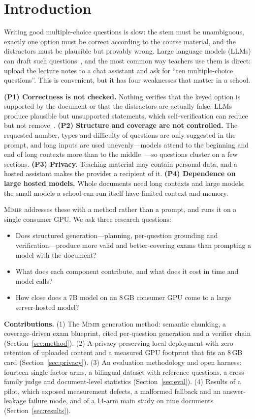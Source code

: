\documentclass[conference]{IEEEtran}
\newcommand{\Mimir}{\textsc{Mimir}}
\begin{document}
\section{Introduction}

Writing good multiple-choice questions is slow: the stem must be unambiguous, exactly one option must
be correct according to the course material, and the distractors must be plausible but provably
wrong. Large language models (LLMs) can draft such questions~\cite{kurdi2020systematic,alhazmi2024distractor},
and the most common way teachers use them is direct: upload the lecture notes to a chat assistant and
ask for ``ten multiple-choice questions''. This is convenient, but it has four weaknesses that matter
in a school.

\textbf{(P1) Correctness is not checked.} Nothing verifies that the keyed option is supported by the
document or that the distractors are actually false; LLMs produce plausible but unsupported
statements, which self-verification can reduce but not remove~\cite{madaan2023selfrefine,dhuliawala2024cove}.
\textbf{(P2) Structure and coverage are not controlled.} The requested number, types and difficulty
of questions are only suggested in the prompt, and long inputs are used unevenly---models attend to
the beginning and end of long contexts more than to the middle~\cite{liu2024lost}---so questions
cluster on a few sections. \textbf{(P3) Privacy.} Teaching material may contain personal data, and a
hosted assistant makes the provider a recipient of it. \textbf{(P4) Dependence on large hosted models.}
Whole documents need long contexts and large models; the small models a school can run itself have
limited context and memory.

\Mimir{} addresses these with a method rather than a prompt, and runs it on a single consumer GPU.
We ask three research questions:
\begin{itemize}
\item[\textbf{RQ1}] Does structured generation---planning, per-question grounding and
verification---produce more valid and better-covering exams than prompting a model with the document?
\item[\textbf{RQ2}] What does each component contribute, and what does it cost in time and model calls?
\item[\textbf{RQ3}] How close does a 7B model on an 8\,GB consumer GPU come to a large server-hosted model?
\end{itemize}

\textbf{Contributions.} (1) The \Mimir{} generation method: semantic chunking, a coverage-driven
exam blueprint, cited per-question generation and a verifier chain (Section~\ref{sec:method}).
(2) A privacy-preserving local deployment with zero retention of uploaded content and a measured
GPU footprint that fits an 8\,GB card (Section~\ref{sec:privacy}). (3) An evaluation methodology and
open harness: fourteen single-factor arms, a bilingual dataset with reference questions, a cross-family
judge and document-level statistics (Section~\ref{sec:eval}). (4) Results of a pilot, which exposed
measurement defects, a malformed fallback and an answer-leakage failure mode, and of a 14-arm main study
on nine documents (Section~\ref{sec:results}).
\end{document}
